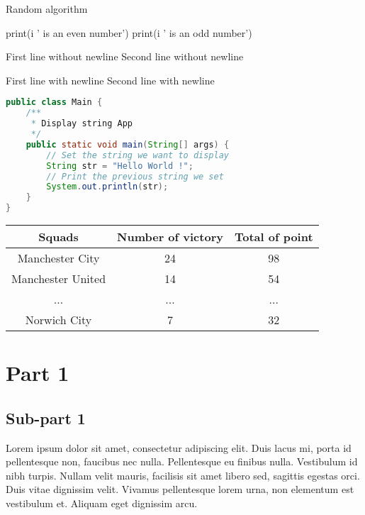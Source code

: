 \documentclass[a4paper,15pt]{article}
\begin{document}
\begin{algorithm}
    \caption{Random algorithm}
    \begin{algorithmic}
    \ENSURE
            \STATE print(i ' is an even number')
        \ENDIF
    \ENDFOR
            \STATE print(i ' is an odd number')
        \ENDIF
    \ENDWHILE
    \ELSE
    \ENDIF
    \end{algorithmic}
\end{algorithm}

First line without newline
Second line without newline

First line with newline\newline
Second line with newline

\begin{lstlisting}[language=Java, style=javaStyle]
public class Main {
    /**
     * Display string App
     */
    public static void main(String[] args) {
        // Set the string we want to display
        String str = "Hello World !";
        // Print the previous string we set
        System.out.println(str);
    }
}
\end{lstlisting}

\begin{tabular}{|c|c||c|}
    \hline
    Squads & Number of victory & Total of point \\
    \hline
    Manchester City & 24 & 98 \\
    Manchester United & 14 & 54 \\
    ... & ... & ... \\
    Norwich City & 7 & 32 \\
    \hline
\end{tabular}

\newpage

\section{Part 1}

\subsection{Sub-part 1}

Lorem ipsum dolor sit amet, consectetur adipiscing elit. Duis lacus mi, porta id pellentesque non, faucibus nec nulla. Pellentesque eu finibus nulla. Vestibulum id nibh turpis. Nullam velit mauris, facilisis sit amet libero sed, sagittis egestas orci. Duis vitae dignissim velit. Vivamus pellentesque lorem urna, non elementum est vestibulum et. Aliquam eget dignissim arcu.
\end{document}
